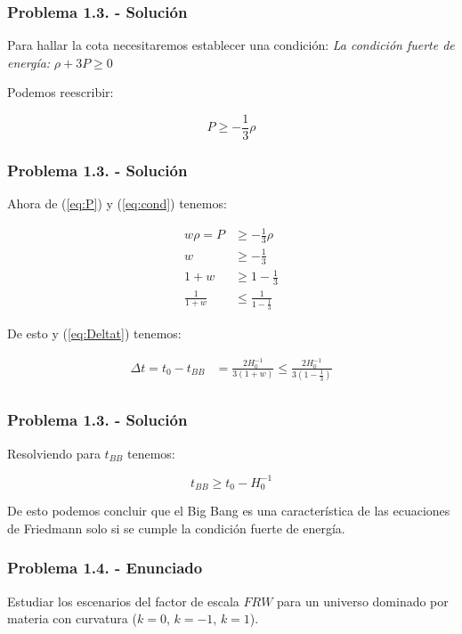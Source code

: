 \begin{frame}
    \frametitle{Problema 1.3. - Solución}

    Para hallar la cota necesitaremos establecer una condición: \textit{La condición fuerte de energía:} $\rho+3P\geq0$

    Podemos reescribir:

    \begin{equation}
        P\geq -\frac{1}{3}\rho
        \label{eq:cond}
    \end{equation}

\end{frame}

\begin{frame}
    \frametitle{Problema 1.3. - Solución}

    Ahora de (\ref{eq:P}) y (\ref{eq:cond}) tenemos:

    \begin{align*}
        w\rho = P &\geq -\frac{1}{3}\rho\\
        w &\geq -\frac{1}{3}\\
        1+w &\geq 1-\frac{1}{3}\\
        \frac{1}{1+w} &\leq \frac{1}{1-\frac{1}{3}}
    \end{align*}

    De esto y (\ref{eq:Deltat}) tenemos:

    \begin{align*}
        \Delta t = t_0-t_{BB} &=\frac{2 H_0^{-1}}{3(1+w)}\leq\frac{2H_0^{-1}}{3(1-\frac{1}{3})}\\
    \end{align*}

\end{frame}

\begin{frame}
    \frametitle{Problema 1.3. - Solución}

    Resolviendo para $t_{BB}$ tenemos:

    \begin{equation}
        t_{BB}\geq t_0-H_0^{-1}\label{eq:tbb-cot}
    \end{equation}

    De esto podemos concluir que el Big Bang es una característica de las ecuaciones de Friedmann solo si se cumple la condición fuerte de energía.

\end{frame}

\begin{frame}
    \frametitle{Problema 1.4. - Enunciado}

    Estudiar los escenarios del factor de escala $FRW$ para un universo dominado por materia con curvatura ($k=0$, $k=-1$, $k=1$).

\end{frame}


